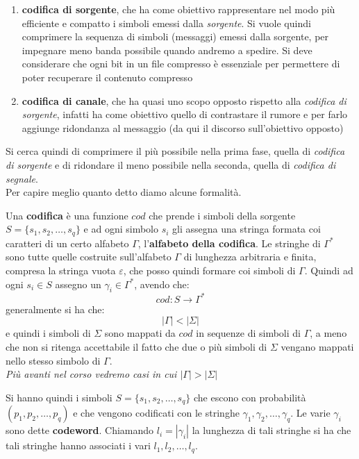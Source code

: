 \documentclass[a4paper,12pt, oneside]{book}
\begin{document}
\begin{enumerate}
  \item \textbf{codifica di sorgente}, che ha come obiettivo rappresentare nel
  modo più efficiente e compatto i simboli emessi dalla \textit{sorgente}. Si
  vuole quindi comprimere la sequenza di simboli (messaggi) emessi dalla
  sorgente, per impegnare meno banda possibile quando andremo a spedire. Si deve
  considerare che ogni bit in un file 
  compresso è essenziale per permettere di poter recuperare il contenuto
  compresso 
  \item \textbf{codifica di canale}, che ha quasi uno scopo opposto rispetto
  alla \textit{codifica di sorgente}, infatti ha come obiettivo quello di
  contrastare il rumore e per farlo aggiunge ridondanza al messaggio (da qui il
  discorso sull'obiettivo opposto)
\end{enumerate}
Si cerca quindi di comprimere il più possibile nella prima fase, quella di
\textit{codifica di sorgente} e di ridondare il meno possibile nella seconda,
quella di \textit{codifica di segnale}.\\
Per capire meglio quanto detto diamo alcune formalità.
\begin{definizione}
  Una \textbf{codifica} è una funzione $cod$ che prende i simboli della sorgente
  $S=\{s_1, s_2,\ldots,s_q\}$ e ad ogni simbolo $s_i$ gli assegna una stringa
  formata coi caratteri di un certo alfabeto $\Gamma$, l'\textbf{alfabeto
    della codifica}. Le stringhe di $\Gamma^*$ sono tutte quelle costruite
  sull'alfabeto $\Gamma$ di lunghezza arbitraria e finita, compresa la stringa
  vuota $\varepsilon$, che posso quindi formare coi simboli di $\Gamma$. Quindi
  ad ogni $s_i\in S$ assegno un $\gamma_i\in \Gamma^*$, avendo che:
  \[cod:S\to \Gamma^*\]
  generalmente si ha che:
  \[|\Gamma|<|\Sigma|\]
  e quindi i simboli di $\Sigma$ sono mappati da $cod$ in  sequenze  di  simboli
  di $\Gamma$, a meno che non si ritenga accettabile il fatto che due o più
  simboli di $\Sigma$ vengano mappati nello stesso simbolo di $\Gamma$. \\
  \textit{Più avanti nel corso vedremo casi in cui $|\Gamma|>|\Sigma|$}
\end{definizione}
Si hanno quindi i simboli $S=\{s_1, s_2,\ldots,s_q\}$ che escono con
probabilità $(p_1,p_2,\ldots,p_q)$ e che vengono codificati con le stringhe
$\gamma_1,\gamma_2,\ldots,\gamma_q$. Le varie $\gamma_i$ sono dette
\textbf{codeword}. Chiamando $l_i=|\gamma_i|$ la lunghezza 
di tali stringhe si ha che tali stringhe hanno associati i vari
$l_1,l_2,\ldots,l_q$.\\
\end{document}
